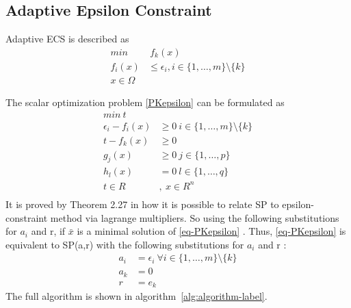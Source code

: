 \documentclass[12pt,a4paper]{article}
\numberwithin{equation}{section}
\begin{document}
\subsection{Adaptive Epsilon Constraint}
Adaptive ECS is described as 
\begin{equation}  \label{PKepsilon}
\begin{split}
min &\ f_{k}(x)  \\
f_{i}(x) &\leq \epsilon_{i} , i \in \{1,\hdots,m\} \setminus \{k\}   \\
x \in \Omega   
\end{split}
\end{equation}



The scalar optimization problem \eqref{PKepsilon} can be formulated as \\
\begin{equation}  \label{eq-PKepsilon}
\begin{split}
min \ t \\  
\epsilon_{i}-f_{i}(x) &\geq 0  \  i\in \{1,\hdots,m\} \setminus \{k\} \\
t-f_{k}(x)&\geq 0  \\
g_j(x)&\geq 0 \  j\in \{1,\hdots,p\} \\
h_{l}(x)&=0   \  l\in \{1,\hdots,q\}  \\
t \in R &, \  x \in R^{n}  \\
\end{split}
\end{equation}
It is proved by Theorem 2.27 in \citep{Eichfelder2008} how it is possible to relate SP to epsilon-constraint method via lagrange multipliers. So using the following substitutions for $a_i$ and r, if $\bar{x}$ is a minimal solution of  \eqref{eq-PKepsilon} . Thus, \eqref{eq-PKepsilon} is equivalent to SP(a,r) with the following substitutions for $a_i$ and r :
\begin{equation}
\begin{split}
a_{i}&=\epsilon_i \ \forall i \in \{1,\hdots,m\} \setminus \{k\}   \\
a_{k}&=0  \\
r&=e_{k}
\end{split}
\end{equation}  
The full algorithm is shown in algorithm~\ref{alg:algorithm-label}.
\end{document}
